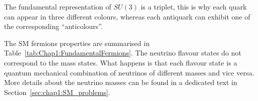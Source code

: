 The fundamental representation of $SU(3)$ is a triplet, this is why each quark can appear in three different colours, whereas each antiquark can exhibit one of the corresponding ``anticolours''. 




The SM fermions properties are summarised in Table~\ref{tab:Chap1:FundamentalFermions}. 
The neutrino flavour states do not correspond to 
the mass states. What happens is that each 
flavour state is a quantum mechanical combination of neutrinos of different masses and vice versa.
More details about the neutrino masses can be found in a dedicated text in Section~\ref{sec:chap1:SM_problems}.

